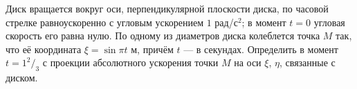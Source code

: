 Диск вращается вокруг оси, перпендикулярной плоскости диска,
по часовой стрелке равноускоренно с угловым ускорением $1$ рад/с$^2$;
в момент $t = 0$ угловая скорость его равна нулю.
По одному из диаметров диска колеблется точка $M$ так,
что её координата $\xi = \sin{\pi t}$ м, причём $t$ --- в секундах.
Определить в момент $t = 1^2/_3$ с
проекции абсолютного ускорения точки $M$
на оси $\xi$, $\eta$, связанные с диском.
